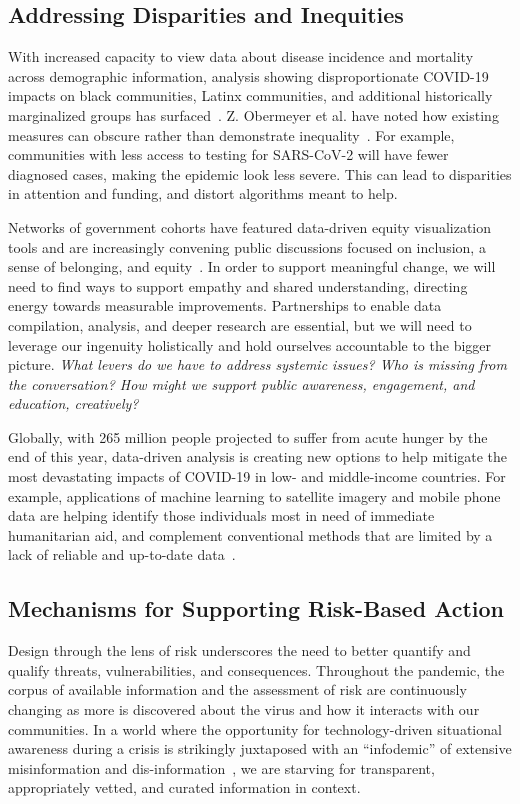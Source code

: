 \subsection*{Addressing Disparities and Inequities}
With increased capacity to view data about disease incidence and mortality across demographic information, analysis showing disproportionate COVID-19 impacts on black communities, Latinx communities, and additional historically marginalized groups has surfaced~\cite{covidrace}. Z. Obermeyer et al. have noted how existing measures can obscure rather than demonstrate inequality~\cite{Obermeyer447}. For example, communities with less access to testing for SARS-CoV-2 will have fewer diagnosed cases, making the epidemic look less severe. This can lead to disparities in attention and funding, and distort algorithms meant to help. 

Networks of government cohorts have featured data-driven equity visualization tools and are increasingly convening public discussions focused on inclusion, a sense of belonging, and equity~\cite{GARE}. In order to support meaningful change, we will need to find ways to support empathy and shared understanding, directing energy towards measurable improvements. Partnerships to enable data compilation, analysis, and deeper research are essential, but we will need to leverage our ingenuity holistically and hold ourselves accountable to the bigger picture. \emph{What levers do we have to address systemic issues? Who is missing from the conversation? How might we support public awareness, engagement, and education, creatively?} 

Globally, with 265 million people projected to suffer from acute hunger by the end of this year, data-driven analysis is creating new options to help mitigate the most devastating impacts of COVID-19 in low- and middle-income countries.  For example, applications of machine learning to satellite imagery and mobile phone data are helping identify those individuals most in need of immediate humanitarian aid, and complement conventional methods that are limited by a lack of reliable and up-to-date data~\cite{blumenstock2020machine, blumenstock2016fighting}. 

\subsection*{Mechanisms for Supporting Risk-Based Action}
Design through the lens of risk underscores the need to better quantify and qualify threats, vulnerabilities, and consequences. Throughout the pandemic, the corpus of available information and the assessment of risk are continuously changing as more is discovered about the virus and how it interacts with our communities. In a world where the opportunity for technology-driven situational awareness during a crisis is strikingly juxtaposed with an “infodemic” of extensive misinformation and dis-information~\cite{zade, UN, Hany}, we are starving for transparent, appropriately vetted, and curated information in context.  

